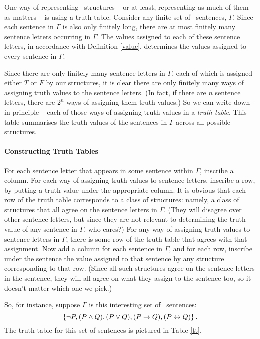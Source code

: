 One way of representing \lone\ structures – or at least, representing as much of them as matters – is using a truth table. Consider any finite set of \lone\ sentences,  $\Gamma$. Since each sentence in $\Gamma$ is also only finitely long, there are at most finitely many sentence letters occurring in $\Gamma$. The values assigned to each of these sentence letters, in accordance with Definition \ref{value}, determines the values assigned to every sentence in $\Gamma$.

Since there are only finitely many sentence letters in $\Gamma$, each of which is assigned either $T$ or $F$ by our structures, it is clear there are only finitely many ways of assigning truth values to the sentence letters. (In fact, if there are $n$ sentence letters, there are $2^n$ ways of assigning them truth values.) So we can write down – in principle – each of those ways of assigning truth values in a \emph{truth table}. This table summarises the truth values of the sentences in $\Gamma$ across all possible \lone-structures. 

\paragraph{Constructing Truth Tables} For each sentence letter that appears in some sentence within $\Gamma$, inscribe a column. For each way of assigning truth values to sentence letters, inscribe a row, by putting a truth value under the appropriate column. It is obvious that each row of the truth table corresponds to a class of structures: namely, a class of structures that all agree on the sentence letters in $\Gamma$. (They will disagree over other sentence letters, but since they are not relevant to determining the truth value of any sentence in $\Gamma$, who cares?) For any way of assigning truth-values to sentence letters in $\Gamma$, there is some row of the truth table that agrees with that assignment. Now add a column for each sentence in $\Gamma$, and for each row, inscribe under the sentence the value assigned to that sentence by any structure corresponding to that row. (Since all such structures agree on the sentence letters in the sentence, they will all agree on what they assign to the sentence too, so it doesn't matter which one we pick.) 

So, for instance, suppose $\Gamma$ is this interesting set of \lone\ sentences: $$\left\{\neg P, (P\wedge Q), (P\vee Q), (P \to Q), (P\leftrightarrow Q)\right\}.$$ The truth table for this set of sentences is pictured in Table \ref{tt}. 

